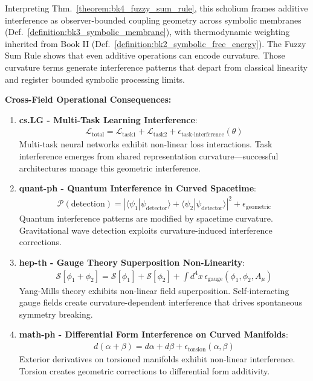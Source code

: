 \begin{scholium}
\label{scholium:bk4_symbolic_interference}
Interpreting Thm.~\ref{theorem:bk4_fuzzy_sum_rule}, this scholium frames
additive interference as observer-bounded coupling geometry across symbolic
membranes (Def.~\ref{definition:bk3_symbolic_membrane}), with thermodynamic
weighting inherited from Book II
(Def.~\ref{definition:bk2_symbolic_free_energy}).
The Fuzzy Sum Rule shows that even additive operations can encode curvature.
Those curvature terms generate interference patterns that depart from classical
linearity and register bounded symbolic processing limits.

\textbf{Cross-Field Operational Consequences:}

\begin{enumerate}
\item \textbf{cs.LG - Multi-Task Learning Interference}: 
   \begin{align}
   \mathcal{L}_{\text{total}} = \mathcal{L}_{\text{task1}} + \mathcal{L}_{\text{task2}} + \epsilon_{\text{task-interference}}(\theta)
   \end{align}
   Multi-task neural networks exhibit non-linear loss interactions. Task interference emerges from shared representation curvature---successful architectures manage this geometric interference.

\item \textbf{quant-ph - Quantum Interference in Curved Spacetime}:
   \begin{align}
   \mathcal{P}(\text{detection}) = |\langle \psi_1 | \psi_{\text{detector}} \rangle + \langle \psi_2 | \psi_{\text{detector}} \rangle|^2 + \epsilon_{\text{geometric}}
   \end{align}
   Quantum interference patterns are modified by spacetime curvature. Gravitational wave detection exploits curvature-induced interference corrections.

\item \textbf{hep-th - Gauge Theory Superposition Non-Linearity}:
   \begin{align}
   \mathcal{S}[\phi_1 + \phi_2] = \mathcal{S}[\phi_1] + \mathcal{S}[\phi_2] + \int d^4x \, \epsilon_{\text{gauge}}(\phi_1, \phi_2, A_\mu)
   \end{align}
   Yang-Mills theory exhibits non-linear field superposition. Self-interacting gauge fields create curvature-dependent interference that drives spontaneous symmetry breaking.

\item \textbf{math-ph - Differential Form Interference on Curved Manifolds}:
   \begin{align}
   d(\alpha + \beta) = d\alpha + d\beta + \epsilon_{\text{torsion}}(\alpha, \beta)
   \end{align}
   Exterior derivatives on torsioned manifolds exhibit non-linear interference. Torsion creates geometric corrections to differential form additivity.


\end{enumerate}
\end{scholium}
